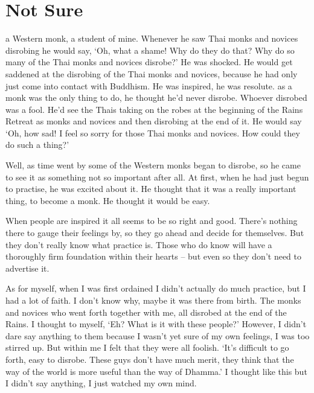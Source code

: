 

\chapter{Not Sure}

 a Western monk, a student of mine. Whenever he saw Thai monks and novices disrobing he would say, `Oh, what a shame! Why do they do that? Why do so many of the Thai monks and novices disrobe?' He was shocked. He would get saddened at the disrobing of the Thai monks and novices, because he had only just come into contact with Buddhism. He was inspired, he was resolute.  as a monk was the only thing to do, he thought he'd never disrobe. Whoever disrobed was a fool. He'd see the Thais taking on the robes at the beginning of the Rains Retreat as monks and novices and then disrobing at the end of it. He would say `Oh, how sad! I feel so sorry for those Thai monks and novices. How could they do such a thing?'

Well, as time went by some of the Western monks began to disrobe, so he came to see it as something not so important after all. At first, when he had just begun to practise, he was excited about it. He thought that it was a really important thing, to become a monk. He thought it would be easy.

When people are inspired it all seems to be so right and good. There's nothing there to gauge their feelings by, so they go ahead and decide for themselves. But they don't really know what practice is. Those who do know will have a thoroughly firm foundation within their hearts -- but even so they don't need to advertise it.

As for myself, when I was first ordained I didn't actually do much practice, but I had a lot of faith. I don't know why, maybe it was there from birth. The monks and novices who went forth together with me, all disrobed at the end of the Rains. I thought to myself, `Eh? What is it with these people?' However, I didn't dare say anything to them because I wasn't yet sure of my own feelings, I was too stirred up. But within me I felt that they were all foolish. `It's difficult to go forth, easy to disrobe. These guys don't have much merit, they think that the way of the world is more useful than the way of Dhamma.' I thought like this but I didn't say anything, I just watched my own mind.

